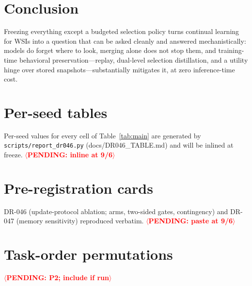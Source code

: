 \documentclass[11pt]{article}
\newcommand{\pending}[1]{\textcolor{red}{\textbf{$\langle$PENDING: #1$\rangle$}}}
\begin{document}
\section{Conclusion}
Freezing everything except a budgeted selection policy turns continual learning for WSIs into a question that can be asked cleanly and answered mechanistically: models do forget where to look, merging alone does not stop them, and training-time behavioral preservation---replay, dual-level selection distillation, and a utility hinge over stored snapshots---substantially mitigates it, at zero inference-time cost.




\appendix
\section{Per-seed tables}
Per-seed values for every cell of Table~\ref{tab:main} are generated by \texttt{scripts/report\_dr046.py} (docs/DR046\_TABLE.md) and will be inlined at freeze. \pending{inline at 9/6}
\section{Pre-registration cards}
DR-046 (update-protocol ablation; arms, two-sided gates, contingency) and DR-047 (memory sensitivity) reproduced verbatim. \pending{paste at 9/6}
\section{Task-order permutations}
\pending{P2; include if run}

\end{document}
